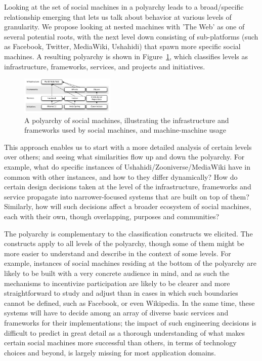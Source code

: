 \documentclass{sig-alternate}
\begin{document}
Looking at the set of social machines in a polyarchy leads to a broad/specific relationship emerging that lets us talk about behavior at various levels of granularity.  We propose looking at nested machines with 'The Web' as one of several potential roots, with the next level down consisting of sub-platforms (such as Facebook, Twitter, MediaWiki, Ushahidi) that spawn more specific social machines. A resulting polyarchy is shown in Figure~\ref{polyarchy}, which classifies levels as infrastructure, frameworks, services, and projects and initiatives.

\begin{figure}[htb]
\begin{center}
\includegraphics[width=0.4\textwidth]{img/polyarchy.pdf}
\caption{A polyarchy of social machines, illustrating the infrastructure and frameworks used by social machines, and machine-machine usage} \label{polyarchy}
\end{center}
\end{figure}

This approach enables us to start with a more detailed analysis of certain levels over others;
and seeing what similarities flow up and down the polyarchy. For example, what do
specific instances of Ushahidi/Zooniverse/MediaWiki have in common with other instances, and
how to they differ dynamically? How do certain design decisions taken at the level of the infrastructure, frameworks and service propagate into narrower-focused systems that are built on top of them? Similarly, how will such decisions affect a broader ecosystem of social machines, each with their own, though overlapping, purposes and communities?

The polyarchy is complementary to the classification constructs we elicited. The constructs apply to all levels of the polyarchy, though some of them might be more easier to understand and describe in the context of some levels. For example, instances of social machines residing at the bottom of the polyarchy are likely to be built with a very concrete audience in mind, and as such the mechanisms to incentivize participation are likely to be clearer and more straightforward to study and adjust than in cases in which such boundaries cannot be defined, such as Facebook, or even Wikipedia. In the same time, these systems will have to decide among an array of diverse basic services and frameworks for their implementations; the impact of such engineering decisions is difficult to predict in great detail as a thorough understanding of what makes certain social machines more successful than others, in terms of technology choices and beyond, is largely missing for most application domains.
\end{document}
